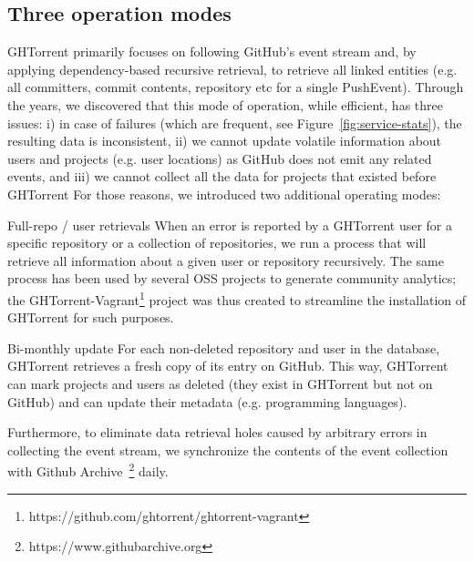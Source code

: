 \documentclass{sig-alternate}
\begin{document}
\subsection{Three operation modes}

GHTorrent primarily focuses on following GitHub's event stream and, by applying
dependency-based recursive retrieval, to retrieve all linked entities (e.g.  all
committers, commit contents, repository etc for a single PushEvent).
Through the years, we discovered that this mode of operation, while efficient,
has three issues: i) in case of failures (which are frequent, see
Figure~\ref{fig:service-stats}), the resulting data is inconsistent,
ii) we cannot update volatile information about users and projects (e.g. user
locations) as GitHub does not emit any related events, and
iii) we cannot collect all the data for projects that existed before GHTorrent
For those reasons, we introduced two additional operating modes:

\begin{compactdesc}

  \item[Full-repo / user retrievals] When an error is reported by a GHTorrent
    user for a specific repository or a collection of repositories, we run a
    process that will retrieve all information about a given user or repository
    recursively. The same process has been used by several OSS projects to
    generate community analytics; the
    GHTorrent-Vagrant\footnote{https://github.com/ghtorrent/ghtorrent-vagrant}
    project was thus created to streamline the installation of GHTorrent for
    such purposes.

  \item[Bi-monthly update] For each non-deleted repository and user in the
    database, GHTorrent retrieves a fresh copy of its entry on GitHub. This way,
    GHTorrent can mark projects and users as deleted (they exist in GHTorrent
    but not on GitHub) and can update their metadata (e.g. programming
    languages).

\end{compactdesc}

Furthermore, to eliminate data retrieval holes caused by arbitrary errors in
collecting the event stream, we synchronize the contents of the event collection
with Github Archive~\footnote{https://www.githubarchive.org} daily.
\end{document}
